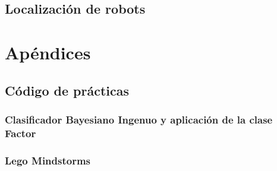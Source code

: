 \documentclass[12pt,openany]{book}
\begin{document}




\chapter{Localización de robots}





\part{Apéndices}

\appendix
\chapter{Código de prácticas}

\section[Clasificador Bayesiano Ingenuo y Factores]{Clasificador Bayesiano Ingenuo y aplicación de la clase Factor}
\label{appe:aplicaciones}


\newpage

\section[Lego Mindstorms]{Lego Mindstorms}
\label{appe:lego}




\backmatter

\printbibliography[heading=bibintoc]
\end{document}
